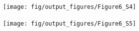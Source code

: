 \documentclass[a4paper,12pt]{article}
\newcommand{\ssc}[3]{\ensuremath{#1_{\text{#2}_{\text{#3}}}}}
\newcommand{\gE      }{\ssc{g}      {\scriptsize{E}}{}}
\newcommand{\gI      }{\ssc{g}      {\scriptsize{I}}{}}
\begin{document}
{\clearpage

\begin{figure}[ht!]
    \internallinenumbers
    \centering
        \texttt{[image: fig/output\_figures/Figure6\_S4]}
    \caption{}
\end{figure}

\clearpage

\begin{figure}[ht!]
    \internallinenumbers
    \centering
        \texttt{[image: fig/output\_figures/Figure6\_S5]}
    \caption{}
\end{figure}

\clearpage

%
%
}
\end{document}
